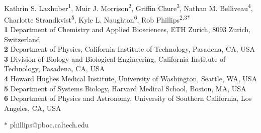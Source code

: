 \documentclass[10pt,letterpaper]{article}
\begin{document}
	
\begin{flushleft}
	{\Large
		\textbf{}
	}
	\newline
		\\
	Kathrin S. Laxhuber\textsuperscript{1},
	Muir J. Morrison\textsuperscript{2},
	Griffin Chure\textsuperscript{3},
	Nathan M. Belliveau\textsuperscript{4},
	Charlotte Strandkvist\textsuperscript{5},
	Kyle L. Naughton\textsuperscript{6},
	Rob Phillips\textsuperscript{2,3$\ast$}
	\\
	\bigskip
	\textbf{1} Department of Chemistry and Applied Biosciences, ETH Zurich, 8093 Zurich, Switzerland
	\\
	\textbf{2} Department of Physics, California Institute of Technology, Pasadena, CA, USA
	\\
	\textbf{3} Division of Biology and Biological Engineering, California Institute of Technology, Pasadena, CA, USA
	\\
	\textbf{4} Howard Hughes Medical Institute, University of Washington, Seattle, WA, USA
	\\
	\textbf{5} Department of Systems Biology, Harvard Medical School, Boston, MA, USA
	\\
	\textbf{6} Department of Physics and Astronomy, University of Southern California, Los Angeles, CA, USA
	\\
	\bigskip
	
	
	
	
	
	
	$\ast$ phillips@pboc.caltech.edu
	
\end{flushleft}	
\end{document}
